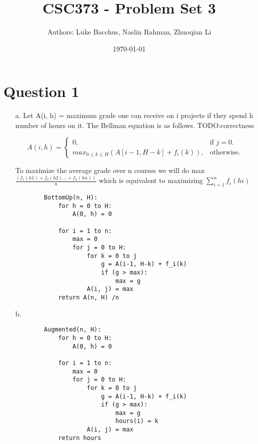 \documentclass[12pt]{article}
\title{\textbf{CSC373 - Problem Set 3}}
\author{Authors: Luke Bacchus, Naslin Rahman, Zhuoqian Li}
\date{\today}
\begin{document}
\maketitle
\section*{Question 1}
\begin{enumerate}
    \item[a.] Let A(i, h) = maximum grade one can receive on i projects if they spend h number of hours on it. The Bellman equation is as follows. TODO:correctness
    
        \begin{equation}
            A(i,h)=\begin{cases}
         0, & \text{if $j=0$}.\\
        max_{0 \leq k \leq H}(A[i-1,H-k] + f_i(k)), & \text{otherwise}.
        \end{cases}
        \end{equation}
  
    To maximize the average grade over n courses we will do max $\frac{(f_1(h1) + f_2(h2) ... + f_n(hn))}{n}$ which is equivalent to maximizing $\sum_{i = 1}^ {n} f_i(hi)$
  
    \begin{verbatim}
        BottomUp(n, H):
            for h = 0 to H:
                A(0, h) = 0
            
            for i = 1 to n:
                max = 0
                for j = 0 to H:
                    for k = 0 to j
                        g = A(i-1, H-k) + f_i(k)
                        if (g > max):
                            max = g
                    A(i, j) = max
            return A(n, H) /n
    \end{verbatim}
    
    \item[b.] \begin{verbatim}
        Augmented(n, H):
            for h = 0 to H:
                A(0, h) = 0
            
            for i = 1 to n:
                max = 0
                for j = 0 to H:
                    for k = 0 to j
                        g = A(i-1, H-k) + f_i(k)
                        if (g > max):
                            max = g
                            hours(i) = k
                    A(i, j) = max
            return hours
                    
        
    \end{verbatim}
    
    
\end{enumerate}
    
\end{document}
